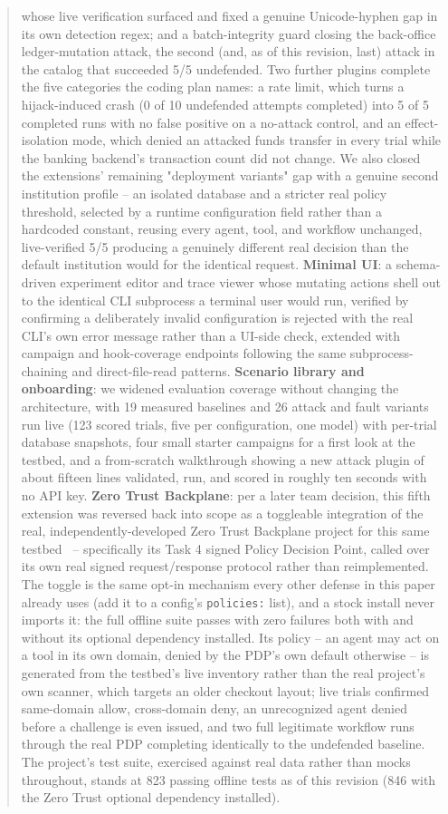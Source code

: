 \documentclass[conference]{IEEEtran}
\begin{document}
\begin{abstract}
whose live verification surfaced and fixed a genuine Unicode-hyphen gap in its own detection regex; and a batch-integrity guard closing the back-office ledger-mutation attack, the second (and, as of this revision, last) attack in the catalog that succeeded 5/5 undefended. Two further plugins complete the five categories the coding plan names: a rate limit, which turns a hijack-induced crash (0 of 10 undefended attempts completed) into 5 of 5 completed runs with no false positive on a no-attack control, and an effect-isolation mode, which denied an attacked funds transfer in every trial while the banking backend's transaction count did not change. We also closed the extensions' remaining "deployment variants" gap with a genuine second institution profile -- an isolated database and a stricter real policy threshold, selected by a runtime configuration field rather than a hardcoded constant, reusing every agent, tool, and workflow unchanged, live-verified 5/5 producing a genuinely different real decision than the default institution would for the identical request. \textbf{Minimal UI}: a schema-driven experiment editor and trace viewer whose mutating actions shell out to the identical CLI subprocess a terminal user would run, verified by confirming a deliberately invalid configuration is rejected with the real CLI's own error message rather than a UI-side check, extended with campaign and hook-coverage endpoints following the same subprocess-chaining and direct-file-read patterns. \textbf{Scenario library and onboarding}: we widened evaluation coverage without changing the architecture, with 19 measured baselines and 26 attack and fault variants run live (123 scored trials, five per configuration, one model) with per-trial database snapshots, four small starter campaigns for a first look at the testbed, and a from-scratch walkthrough showing a new attack plugin of about fifteen lines validated, run, and scored in roughly ten seconds with no API key. \textbf{Zero Trust Backplane}: per a later team decision, this fifth extension was reversed back into scope as a toggleable integration of the real, independently-developed Zero Trust Backplane project for this same testbed~\cite{ztb_repo} -- specifically its Task 4 signed Policy Decision Point, called over its own real signed request/response protocol rather than reimplemented. The toggle is the same opt-in mechanism every other defense in this paper already uses (add it to a config's \texttt{policies:} list), and a stock install never imports it: the full offline suite passes with zero failures both with and without its optional dependency installed. Its policy -- an agent may act on a tool in its own domain, denied by the PDP's own default otherwise -- is generated from the testbed's live inventory rather than the real project's own scanner, which targets an older checkout layout; live trials confirmed same-domain allow, cross-domain deny, an unrecognized agent denied before a challenge is even issued, and two full legitimate workflow runs through the real PDP completing identically to the undefended baseline. The project's test suite, exercised against real data rather than mocks throughout, stands at 823 passing offline tests as of this revision (846 with the Zero Trust optional dependency installed).

\end{abstract}
\end{document}
